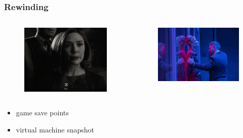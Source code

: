 \documentclass{beamer}
\begin{document}
    \begin{frame}
        \frametitle{Rewinding}
    
        \begin{columns}
            \begin{figure}
                \includegraphics[scale=0.15]{wanda.png}
                
            \end{figure}
            \begin{figure}
                \includegraphics[scale=0.2]{tenet.png}
                
            \end{figure}
            \end{columns}

            \begin{itemize}
                \item game save points
                \item virtual machine snapshot
            \end{itemize}
    
    \end{frame}
\end{document}
